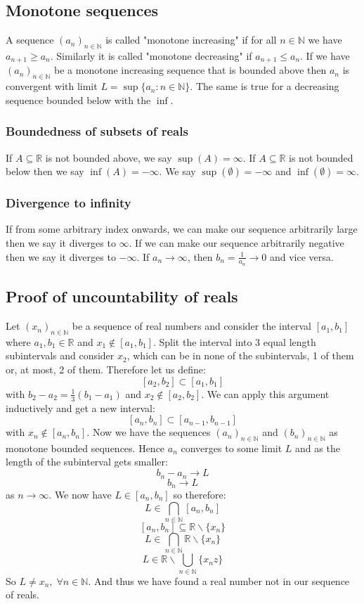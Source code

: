 \documentclass[12pt]{article}
\newcommand{\seq}[2]{(#1_#2)_{#2\in\mathbb{N}}}
\begin{document}
\subsection*{Monotone sequences}
A sequence \(\seq{a}{n}\) is called "monotone increasing" if for all \(n\in\mathbb{N}\) we have \(a_{n+1}\geq a_n\). Similarly it is called "monotone decreasing" if \(a_{n+1}\leq a_n\). If we have \(\seq{a}{n}\) be a monotone increasing sequence that is bounded above then \(a_n\) is convergent with limit \(L=\sup\{a_n:n\in\mathbb{N}\}\). The same is true for a decreasing sequence bounded below with the \(\inf\).
\subsubsection*{Boundedness of subsets of reals}
If \(A\subseteq \mathbb{R}\) is not bounded above, we say \(\sup (A)=\infty\). If \(A\subseteq \mathbb{R}\) is not bounded below then we say \(\inf(A)=-\infty\). We say \(\sup(\emptyset)=-\infty\) and \(\inf(\emptyset)=\infty\).
\subsubsection*{Divergence to infinity}
If from some arbitrary index onwards, we can make our sequence arbitrarily large then we say it diverges to \(\infty\). If we can make our sequence arbitrarily negative then we say it diverges to \(-\infty\). If \(a_n\to\infty\), then \(b_n=\frac{1}{a_n}\to0\) and vice versa.
\subsection*{Proof of uncountability of reals}
Let \(\seq{x}{n}\) be a sequence of real numbers and consider the interval \([a_1,b_1]\) where \(a_1,b_1\in\mathbb{R}\) and \(x_1\notin [a_1,b_1]\). Split the interval into 3 equal length subintervals and consider \(x_2\), which can be in none of the subintervals, 1 of them or, at most, 2 of them. Therefore let us define:
\[[a_2,b_2]\subset[a_1,b_1]\]
with \(b_2-a_2=\frac{1}{3}(b_1-a_1)\) and \(x_2\notin[a_2,b_2]\). We can apply this argument inductively and get a new interval:
\[[a_n,b_n]\subset[a_{n-1},b_{n-1}]\]
with \(x_n\notin[a_n,b_n]\). Now we have the sequences \(\seq{a}{n}\) and \(\seq{b}{n}\) as monotone bounded sequences. Hence \(a_n\) converges to some limit \(L\) and as the length of the subinterval gets smaller:
\[b_n-a_n\to L\]
\[b_n\to L\]
as \(n\to\infty\). We now have \(L\in[a_n,b_n]\) so therefore:
\[L\in\bigcap_{n\in\mathbb{N}}[a_n,b_n]\]
\[[a_n,b_n]\subseteq \mathbb{R}\backslash\{x_n\}\]
\[L\in\bigcap_{n\in\mathbb{N}}\mathbb{R}\backslash\{x_n\}\]
\[L\in\mathbb{R}\backslash\bigcup_{n\in\mathbb{N}}\{x_nz\}\]
So \(L\ne x_n,\;\forall n\in\mathbb{N}\). And thus we have found a real number not in our sequence of reals.
\end{document}
